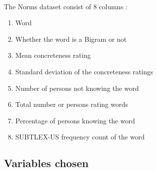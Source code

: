 \documentclass[11pt,a4paper]{article}
\begin{document}
\paragraph{}
The Norms dataset consist of 8 columns :
\begin{enumerate}
	\item Word
	\item Whether the word is a Bigram or not
	\item Mean concreteness rating
	\item Standard deviation of the concreteness ratings
	\item Number of persons not knowing the word
	\item Total number or persons rating words
	\item Percentage of persons knowing the word
	\item SUBTLEX-US frequency count of the word
\end{enumerate}

\subsection{Variables chosen}





\end{document}
